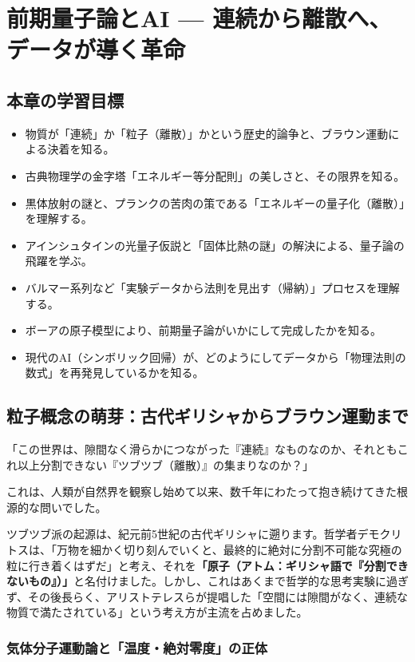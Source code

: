 \chapter{前期量子論とAI --- 連続から離散へ、データが導く革命}

\section*{本章の学習目標}
\begin{itemize}
\item 物質が「連続」か「粒子（離散）」かという歴史的論争と、ブラウン運動による決着を知る。
\item 古典物理学の金字塔「エネルギー等分配則」の美しさと、その限界を知る。
\item 黒体放射の謎と、プランクの苦肉の策である「エネルギーの量子化（離散）」を理解する。
\item アインシュタインの光量子仮説と「固体比熱の謎」の解決による、量子論の飛躍を学ぶ。
\item バルマー系列など「実験データから法則を見出す（帰納）」プロセスを理解する。
\item ボーアの原子模型により、前期量子論がいかにして完成したかを知る。
\item 現代のAI（シンボリック回帰）が、どのようにしてデータから「物理法則の数式」を再発見しているかを知る。
\end{itemize}

\section{粒子概念の萌芽：古代ギリシャからブラウン運動まで}

「この世界は、隙間なく滑らかにつながった『連続』なものなのか、それともこれ以上分割できない『ツブツブ（離散）』の集まりなのか？」

これは、人類が自然界を観察し始めて以来、数千年にわたって抱き続けてきた根源的な問いでした。

ツブツブ派の起源は、紀元前5世紀の古代ギリシャに遡ります。哲学者デモクリトスは、「万物を細かく切り刻んでいくと、最終的に絶対に分割不可能な究極の粒に行き着くはずだ」と考え、それを\textbf{「原子（アトム：ギリシャ語で『分割できないもの』）」}と名付けました。しかし、これはあくまで哲学的な思考実験に過ぎず、その後長らく、アリストテレスらが提唱した「空間には隙間がなく、連続な物質で満たされている」という考え方が主流を占めました。

\subsection{気体分子運動論と「温度・絶対零度」の正体}

